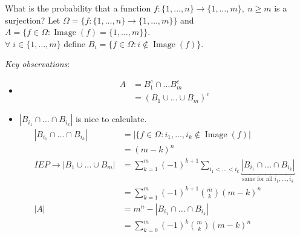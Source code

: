 \begin{example}[Surjections]
    What is the probability that a function $f: \{1,\dots, n\} \to \{1,\dots,m\},\ n \geq m$ is a surjection?
    Let $\Omega = \{f: \{1,\dots,n\} \to \{1,\dots,m\}\}$ and $A = \{f \in \Omega: \operatorname{Image}(f) = \{1, \dots, m\}\}$.\\
    $\forall \; i \in \{1,\dots,m\}$ define $B_i = \{f \in \Omega: i\not \in \operatorname{Image}(f)\}$.

    \emph{Key observations}:
    \begin{itemize}
        \item \begin{align*}
            A &= B_1^c \cap \dots B_m^c \\
            &= (B_1 \cup \dots \cup B_m)^c
        \end{align*} 
        \item $|B_{i_1} \cap \dots \cap B_{i_k}|$ is nice to calculate.
        \begin{align*}
            |B_{i_1} \cap \dots \cap B_{i_k}| &= | \{ f \in \Omega : i_1, \dots, i_k \notin \operatorname{Image}(f) | \\
            &= (m - k)^n \\
            IEP \to |B_1 \cup \dots \cup B_m| &= \sum_{k=1}^{m} (-1)^{k + 1} \sum_{i_1 < \dots < i_k} \underbracket{|B_{i_1} \cap \dots \cap B_{i_k}|}_\text{same for all $i_1, \dots, i_k$}\\
            &= \sum_{k=1}^{m} (-1)^{k+1} \binom{m}{k} (m - k)^n \\
            |A| &= m^n - |B_{i_1} \cap \dots \cap B_{i_k}| \\
            &= \sum_{k=0}^m (-1)^k \binom{m}{k} (m - k)^n 
        \end{align*} 
    \end{itemize}
\end{example} 

